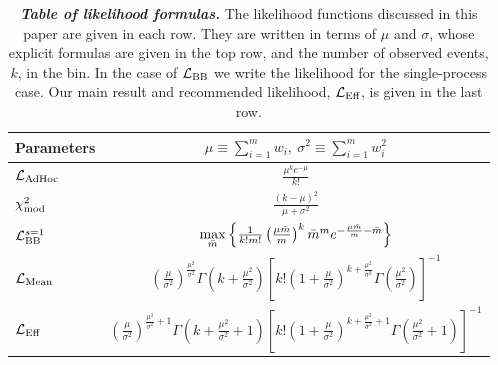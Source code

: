 \documentclass[a4paper, 11pt]{article}
\newcommand{\like}{\mathcal{L}}
\newcommand{\meanl}{\mathcal{L}_{\textmd{Mean}}}
\newcommand{\mcl}{\like_\textmd{Eff}}
\newcommand{\adhoc}{\mathcal{L}_{\textmd{AdHoc}}}
\newcommand{\lbarlow}{\like_{\textmd{BB}}}
\begin{document}
\begin{table}[h!]
\centering
\begin{tabular}{l | c}
\toprule
Parameters & $\mu \equiv \sum_{i=1}^m w_i, ~ \sigma^2 \equiv \sum_{i=1}^m w_i^2$ \\
\hline\hline
$\adhoc$ & $\frac{\mu^{k}e^{-\mu}}{k!}$\\ \hline
$\chi^2_{\rm mod}$ & $\frac{(k - \mu)^2}{\mu + \sigma^2}$ \\ \hline
$\lbarlow^{s=1}$ & $\underset{\bar m}{\rm max} \left\{
\frac{1}{k!m!} \left(\frac{\mu \bar m}{m}\right)^{k}\bar m^{m} e^{-\frac{\mu \bar m}{m} -\bar m} \right\}$ \\ \hline
$\meanl$ & $\left(\frac{\mu}{\sigma^2}\right)^{\frac{\mu^2}{\sigma^2}}\Gamma\left(k+\frac{\mu^2}{\sigma^2}\right)\left[k!\left(1+\frac{\mu}{\sigma^2}\right)^{k+\frac{\mu^2}{\sigma^2}}\Gamma\left(\frac{\mu^2}{\sigma^2}\right)\right]^{-1}$ \\ \hline
$\mcl$ & $\left(\frac{\mu}{\sigma^2}\right)^{\frac{\mu^2}{\sigma^2}+1}\Gamma\left(k+\frac{\mu^2}{\sigma^2}+1\right)\left[k!\left(1+\frac{\mu}{\sigma^2}\right)^{k+\frac{\mu^2}{\sigma^2}+1}\Gamma\left(\frac{\mu^2}{\sigma^2}+1\right)\right]^{-1}$ \\
\bottomrule
\end{tabular}
\caption{\textbf{\textit{Table of likelihood formulas.}} The likelihood functions discussed in this paper are given in each row. They are written in terms of $\mu$ and $\sigma$, whose explicit formulas are given in the top row, and the number of observed events, $k$, in the bin. In the case of $\lbarlow$ we write the likelihood for the single-process case. Our main result and recommended likelihood, $\mcl$, is given in the last row.}
\label{tbl:likelihoods}
\end{table}
\end{document}
